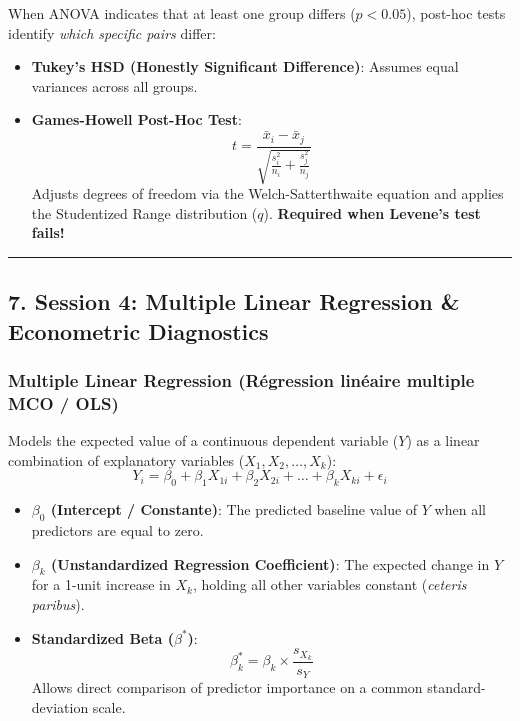 \documentclass[
]{article}
\providecommand{\tightlist}{%
  \setlength{\itemsep}{0pt}\setlength{\parskip}{0pt}}
\begin{document}
When ANOVA indicates that at least one group differs (\(p < 0.05\)),
post-hoc tests identify \emph{which specific pairs} differ:

\begin{itemize}
\tightlist
\item
  \textbf{Tukey's HSD (Honestly Significant Difference)}: Assumes equal
  variances across all groups.
\item
  \textbf{Games-Howell Post-Hoc Test}:
  \[t = \frac{\bar{x}_i - \bar{x}_j}{\sqrt{\frac{s_i^2}{n_i} + \frac{s_j^2}{n_j}}}\]
  Adjusts degrees of freedom via the Welch-Satterthwaite equation and
  applies the Studentized Range distribution (\(q\)). \textbf{Required
  when Levene's test fails!}
\end{itemize}

\begin{center}\rule{0.5\linewidth}{0.5pt}\end{center}

\subsection{7. Session 4: Multiple Linear Regression \& Econometric
Diagnostics}\label{session-4-multiple-linear-regression-econometric-diagnostics}

\subsubsection{Multiple Linear Regression (Régression linéaire multiple
MCO /
OLS)}\label{multiple-linear-regression-ruxe9gression-linuxe9aire-multiple-mco-ols}

Models the expected value of a continuous dependent variable (\(Y\)) as
a linear combination of explanatory variables
(\(X_1, X_2, \dots, X_k\)):
\[Y_i = \beta_0 + \beta_1 X_{1i} + \beta_2 X_{2i} + \dots + \beta_k X_{ki} + \epsilon_i\]

\begin{itemize}
\tightlist
\item
  \textbf{\(\beta_0\) (Intercept / Constante)}: The predicted baseline
  value of \(Y\) when all predictors are equal to zero.
\item
  \textbf{\(\beta_k\) (Unstandardized Regression Coefficient)}: The
  expected change in \(Y\) for a 1-unit increase in \(X_k\), holding all
  other variables constant (\emph{ceteris paribus}).
\item
  \textbf{Standardized Beta (\(\beta^*\))}:
  \[\beta_k^* = \beta_k \times \frac{s_{X_k}}{s_Y}\] Allows direct
  comparison of predictor importance on a common standard-deviation
  scale.
\end{itemize}
\end{document}
